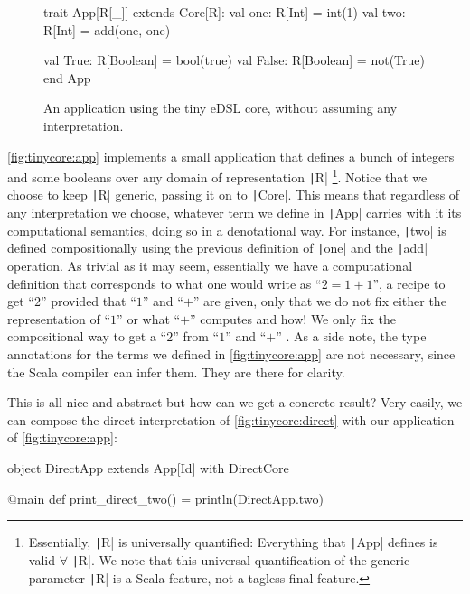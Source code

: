 \documentclass[11pt]{article}
\renewcommand{\vref}[1]{\autoref{#1} \vpageref{#1}}{}
\newcommand{\ScalaI}[1]{\texttt|#1|}
\begin{document}
\begin{figure}[t]
\begin{ScalaBlock}
trait App[R[_]] extends Core[R]:
  val one: R[Int] = int(1)
  val two: R[Int] = add(one, one)
  
  val True: R[Boolean] = bool(true)
  val False: R[Boolean] = not(True)
end App
\end{ScalaBlock}
\caption{An application using the tiny eDSL core, without assuming any interpretation.}
\label{fig:tinycore:app}
\hrulefill
\end{figure}

\vref{fig:tinycore:app} implements a small application that defines a bunch of integers and some booleans over any domain of representation \ScalaI{R}%
\footnote{Essentially, \ScalaI{R} is universally quantified: Everything that \ScalaI{App} defines is valid $\forall$ \ScalaI{R}. We note that this universal quantification of the generic parameter \ScalaI{R} is a Scala feature, not a tagless-final feature.}. Notice that we choose to keep \ScalaI{R} generic, passing it on to \ScalaI{Core}. This means that regardless of any interpretation we choose, whatever term we define in \ScalaI{App} carries with it its computational semantics, doing so in a denotational way. For instance, \ScalaI{two} is defined compositionally using the previous definition of \ScalaI{one} and the \ScalaI{add} operation. As trivial as it may seem, essentially we have a computational definition that corresponds to what one would write as ``$2 = 1 + 1$'', a recipe to get ``$2$'' provided that ``$1$'' and ``$+$'' are given, only that we do not fix either the representation of ``$1$'' or what ``$+$'' computes and how! We only fix the compositional way to get a ``$2$'' from ``$1$'' and ``$+$''%
%
. As a side note, the type annotations for the terms we defined in \autoref{fig:tinycore:app} are not necessary, since the Scala compiler can infer them. They are there for clarity.

This is all nice and abstract but how can we get a concrete result? Very easily, we can compose the direct interpretation of \autoref{fig:tinycore:direct} with our application of \autoref{fig:tinycore:app}:

\begin{ScalaBlockSimple}
object DirectApp extends App[Id] with DirectCore

@main def print_direct_two() = println(DirectApp.two)
\end{ScalaBlockSimple}
\end{document}
